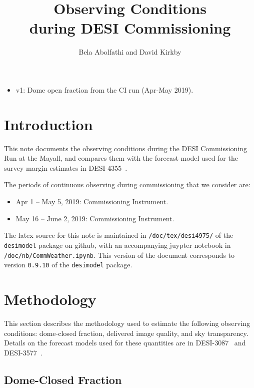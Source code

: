 \documentclass[12pt]{article}
\title{Observing Conditions\\
during DESI Commissioning\\
\vspace{5mm}{\large\bf DESI-doc-4975-v1}}
\author{Bela Abolfathi and David Kirkby}
\begin{document}
\maketitle

\begin{itemize}
    \item v1: Dome open fraction from the CI run (Apr-May 2019).
\end{itemize}

\section{Introduction}

This note documents the observing conditions during the DESI Commissioning Run at the Mayall, and compares them
with the forecast model used for the survey margin estimates in DESI-4355~\cite{desi4355}.

The periods of continuous observing during commissioning that we consider are:
\begin{itemize}
\item Apr 1 -- May 5, 2019: Commissioning Instrument.
\item May 16 -- June 2, 2019: Commissioning Instrument.
\end{itemize}

The latex source for this note is maintained in {\tt /doc/tex/desi4975/} of the {\tt desimodel} package on github,
with an accompanying juypter notebook in {\tt /doc/nb/CommWeather.ipynb}. This version of the document corresponds to
version {\tt 0.9.10} of the {\tt desimodel} package.

\section{Methodology}

This section describes the methodology used to estimate the following observing conditions: dome-closed fraction,
delivered image quality, and sky transparency.  Details on the forecast models used for these quantities are in
DESI-3087~\cite{desi3087} and DESI-3577~\cite{desi3577}.

\subsection{Dome-Closed Fraction}
\end{document}
